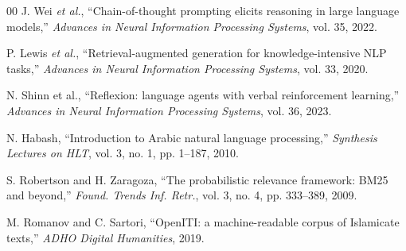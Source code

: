 \documentclass[conference]{IEEEtran}
\begin{document}
\begin{thebibliography}{00}
J. Wei \textit{et al.}, ``Chain-of-thought prompting elicits reasoning in large
language models,'' \textit{Advances in Neural Information Processing Systems},
vol. 35, 2022.

P. Lewis \textit{et al.}, ``Retrieval-augmented generation for knowledge-intensive
NLP tasks,'' \textit{Advances in Neural Information Processing Systems}, vol. 33,
2020.

N. Shinn et al., ``Reflexion: language agents with verbal reinforcement learning,''
\textit{Advances in Neural Information Processing Systems}, vol. 36, 2023.

N. Habash, ``Introduction to Arabic natural language processing,''
\textit{Synthesis Lectures on HLT}, vol. 3, no. 1, pp. 1--187, 2010.

S. Robertson and H. Zaragoza, ``The probabilistic relevance framework: BM25 and beyond,''
\textit{Found. Trends Inf. Retr.}, vol. 3, no. 4, pp. 333--389, 2009.

M. Romanov and C. Sartori, ``OpenITI: a machine-readable corpus of Islamicate
texts,'' \textit{ADHO Digital Humanities}, 2019.

\end{thebibliography}
\end{document}
